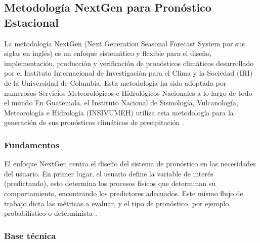 \subsection{Metodología NextGen para Pronóstico Estacional}

\noindent La metodología NextGen (Next Generation Seasonal Forecast System por sus siglas en inglés) es un enfoque sistemático y flexible para el diseño, implementación, producción y verificación de pronósticos climáticos desarrollado por el Instituto Internacional de Investigación para el Clima y la Sociedad (IRI) de la Universidad de Columbia. Esta metodología ha sido adoptada por numerosos Servicios Meteorológicos e Hidrológicos Nacionales a lo largo de todo el mundo En Guatemala, el Instituto Nacional de Sismología, Vulcanología, Meteorología e Hidrología (INSIVUMEH) utiliza esta metodología para la generación de sus pronósticos climáticos de precipitación \citep{malawi}.

\subsubsection{Fundamentos}

El enfoque NextGen centra el diseño del sistema de pronóstico en las necesidades del usuario. En primer lugar, el usuario define la variable de interés (predictando), esto determina los procesos físicos que determinan su comportamiento, encontrando los predictores adecuados. Este mismo flujo de trabajo dicta las métricas a evaluar, y el tipo de pronóstico, por ejemplo, probabilístico o determinista \citep{irinext}.

\subsubsection{Base técnica}

